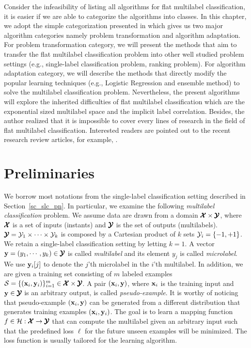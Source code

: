 {Consider the infeasibility of listing all algorithms for flat multilabel classification, it is easier if we are able to categorize the algorithms into classes.
In this chapter, we adopt the simple categorization presented in \citep{Tsoumakas07multi,Tsoumakas10mining} which gives us two major algorithm categories namely problem transformation and algorithm adaptation.
For problem transformation category, we will present the methods that aim to transfer the flat multilabel classification problem into other well studied problem settings (e.g., single-label classification problem, ranking problem).
For algorithm adaptation category, we will describe the methods that directly modify the popular learning techniques (e.g., Logistic Regression and ensemble method) to solve the multilabel classification problem.
Nevertheless, the present algorithms will explore the inherited difficulties of flat multilabel classification which are the exponential sized multilabel space and the implicit label correlation.
Besides, the author realized that it is impossible to cover every lines of research in the field of flat multilabel classification.
Interested readers are pointed out to the recent research review articles, for example, \citep{Tsoumakas07multi,Tsoumakas10mining,Zhang14a}.



\section{Preliminaries} \label{sc_mlc_pn}

We borrow most notations from the single-label classification setting described in Section~\ref{sc_slc_pn}.
In particular, we examine the following \textit{multilabel classification} problem.
We assume data are drawn from a domain $\pmb {\mathcal{X}}\times\pmb {\mathcal{Y}}$, where $\pmb {\mathcal{X}}$ is a set of inputs (instants) and $\pmb {\mathcal{Y}}$ is the set of outputs (multilabels).
$\pmb {\mathcal{Y}} = \mathcal{Y}_1\times\cdots\times\mathcal{Y}_k$ is composed by a Cartesian product of $k$ sets $\mathcal{Y}_i=\{-1,+1\}$.
We retain a single-label classification setting by letting $k=1$.
A vector $\mathbf {y}=(y_1,\cdots,y_k)\in\pmb {\mathcal{Y}}$ is called \textit{multilabel} and its element $y_j$ is called \textit{microlabel}.
We use $\mathbf {y}_i[j]$ to denote the $j$'th microlabel in the $i$'th multilabel.
In addition, we are given a training set consisting of $m$ labeled examples $\mathcal{S}=\{(\mathbf {x}_i,\mathbf {y}_i)\}_{i=1}^{m}\in\pmb {\mathcal{X}}\times\pmb {\mathcal{Y}}$. 
A pair $(\mathbf {x}_i,\mathbf {y})$, where $\mathbf {x}_i$ is the training input and $\mathbf {y}\in\pmb {\mathcal{Y}}$ is an arbitrary output, is called \textit{pseudo-example}.
It is worthy of noticing that pseudo-example $(\mathbf {x}_i,\mathbf {y})$ can be generated from a different distribution that generates training examples $(\mathbf {x}_i,\mathbf {y}_i)$.
The goal is to learn a mapping function $f\in\mathcal{H}:\pmb {\mathcal{X}}\rightarrow\pmb {\mathcal{Y}}$ that can compute the multilabel given an arbitrary input such that the predefined loss $\ell$ for the future unseen examples will be minimized.
The loss function is usually tailored for the learning algorithm.



}
